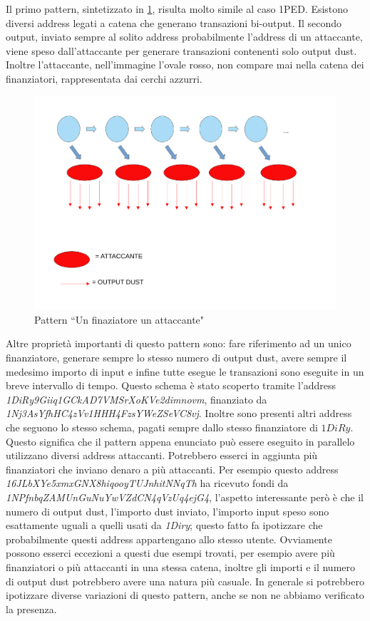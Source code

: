 Il primo pattern, sintetizzato in \ref{fig:schema1}, risulta molto simile al caso 1PED. Esistono diversi address legati a catena che generano transazioni bi-output. Il secondo output, inviato sempre al solito address probabilmente l'address di un attaccante, viene speso dall'attaccante per generare transazioni contenenti solo output dust. Inoltre l'attaccante, nell'immagine l'ovale rosso, non compare mai nella catena dei finanziatori, rappresentata dai cerchi azzurri.
\begin{figure}[h!]
    \centering
    \includegraphics[scale=0.4]{Images/dust_attack1.pdf}
    \caption{Pattern ``Un finaziatore un attaccante"}
    \label{fig:schema1}
\end{figure}
\FloatBarrier
Altre proprietà importanti di questo pattern sono: fare riferimento ad un unico finanziatore, generare sempre lo stesso numero di output dust, avere sempre il medesimo importo di input e infine tutte esegue le transazioni sono eseguite in un breve intervallo di tempo. Questo schema è stato scoperto tramite l'address \textit{1DiRy9Giiq1GCkAD7VMSrXoKVe2dimnovm}, finanziato da \textit{1Nj3AsYfhHC4zVv1HHH4FzsYWeZSeVC8vj}. Inoltre sono presenti altri address che seguono lo stesso schema, pagati sempre dallo stesso finanziatore di $1DiRy$. Questo significa che il pattern appena enunciato può essere eseguito in parallelo utilizzano diversi address attaccanti. Potrebbero esserci in aggiunta più finanziatori che inviano denaro a più attaccanti. Per esempio questo address \textit{16JLbXYe5xmxGNX8hiqooyTUJnhitNNqTh} ha ricevuto fondi da \textit{1NPfnbqZAMUnGuNuYwVZdCN4qVzUq4ejG4}, l'aspetto interessante però è che il numero di output dust, l'importo dust inviato, l'importo input speso sono esattamente uguali a quelli usati da \textit{1Diry}; questo fatto fa ipotizzare che probabilmente questi address appartengano allo stesso utente. Ovviamente possono esserci eccezioni a questi due esempi trovati, per esempio avere più finanziatori o più attaccanti in una stessa catena, inoltre gli importi e il numero di output dust potrebbero avere una natura più casuale. In generale si potrebbero ipotizzare diverse variazioni di questo pattern, anche se non ne abbiamo verificato la presenza.


